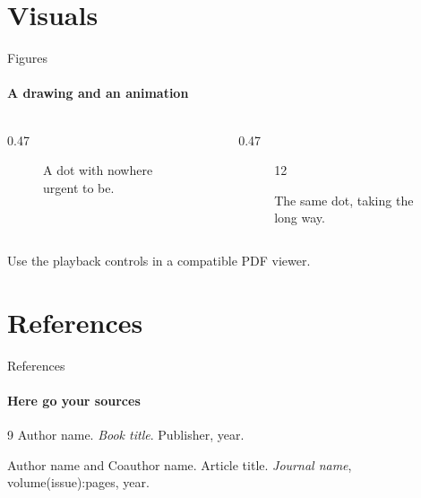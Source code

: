 \documentclass[aspectratio=169,14pt]{beamer}
\begin{document}
\section{Visuals}
\begin{frame}[t]{Figures}
  \framesubtitle{A drawing and an animation}
  \begin{columns}[T,onlytextwidth]
    \begin{column}{0.47\textwidth}
      \begin{figure}
        \centering
        \caption{A dot with nowhere urgent to be.}
      \end{figure}
    \end{column}
    \begin{column}{0.47\textwidth}
      \begin{figure}
        \centering
        \begin{animateinline}[
          controls,loop,poster=first,buttonsize=3mm,
          buttonfg=0.2:0.2:0.7,
          alttext={A dot moving around a circular path}
        ]{12}
        \end{animateinline}
        \caption{The same dot, taking the long way.}
      \end{figure}
    \end{column}
  \end{columns}
  \vspace{2mm}
  {\small\color{Secondary}Use the playback controls in a compatible PDF viewer.\par}
\end{frame}

\section{References}
\begin{frame}[t]{References}
  \framesubtitle{Here go your sources}
  \begin{thebibliography}{9}
      Author name.
      \newblock \emph{Book title}.
      \newblock Publisher, year.

      Author name and Coauthor name.
      \newblock Article title.
      \newblock \emph{Journal name}, volume(issue):pages, year.
  \end{thebibliography}
\end{frame}
\end{document}
